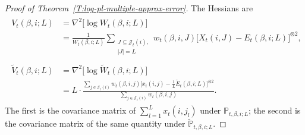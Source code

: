 \documentclass[aoas,preprint]{imsart}
\begin{document}
\begin{proof}[Proof of Theorem~\ref{T:log-pl-multiple-approx-error}]
The Hessians are
\begin{align}
    \begin{split}
    V_t(\beta,i;L)
        &=
        \nabla^2 \big[  \log W_t(\beta, i; L) \big] \\
        &=
        \frac{1}{W_t(\beta,i;L)}
        \sum_{\substack{J \subseteq \mathcal{J}_t(i), \\
                        |J| = L}}
            w_t(\beta,i,J)
            \Big[
                X_t(i,J)
                -
                E_t(\beta,i;L)
            \Big]^{\otimes 2},
    \end{split} \\
    \begin{split}
    \widetilde V_t(\beta,i;L)
        &=
        \nabla^2 \big[ \log \widetilde W_t(\beta,i;L) \big] \\
        &=
        L
        \cdot
        \frac{
            \sum_{j \in \mathcal{J}_t(i)}
                w_t(\beta, i, j)
                \Big[ x_t(i,j) - \tfrac{1}{L} \widetilde E_t(\beta,i;L) \Big]^{\otimes 2}
        }{
            \sum_{j \in \mathcal{J}_t(i)}
                w_t(\beta, i, j)
        }.
    \end{split}
\end{align}
The first is the covariance matrix of $\sum_{l=1}^L x_t(i,j_l)$ under
$\mathbb{P}_{t,\beta,i;L}$; the second is the covariance matrix of the same
quantity under $\tilde{\mathbb{P}}_{t,\beta,i;L}$.



\end{proof}
\end{document}

